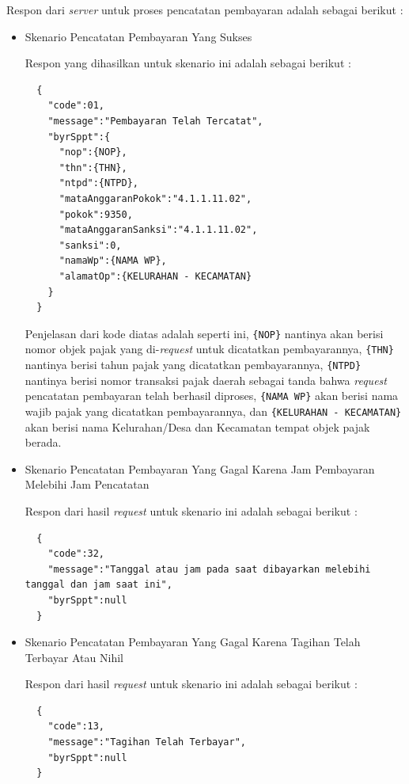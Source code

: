 \documentclass[pdftex,12pt, oneside]{article}
\begin{document}
Respon dari \textit{server} untuk proses pencatatan pembayaran adalah sebagai berikut :

\begin{itemize}
  \item Skenario Pencatatan Pembayaran Yang Sukses
  
  Respon yang dihasilkan untuk skenario ini adalah sebagai berikut :
  
  \begin{lstlisting}
  {
    "code":01,
    "message":"Pembayaran Telah Tercatat",
    "byrSppt":{
      "nop":{NOP},
      "thn":{THN},
      "ntpd":{NTPD},
      "mataAnggaranPokok":"4.1.1.11.02",
      "pokok":9350,
      "mataAnggaranSanksi":"4.1.1.11.02",
      "sanksi":0,
      "namaWp":{NAMA WP},
      "alamatOp":{KELURAHAN - KECAMATAN}
    }
  }
  \end{lstlisting}
  
  Penjelasan dari kode diatas adalah seperti ini, \texttt{\{NOP\}} nantinya akan berisi nomor objek pajak yang di-\textit{request} untuk dicatatkan pembayarannya, \texttt{\{THN\}} nantinya berisi tahun pajak yang dicatatkan pembayarannya, \texttt{\{NTPD\}} nantinya berisi nomor transaksi pajak daerah sebagai tanda bahwa \textit{request} pencatatan pembayaran telah berhasil diproses, \texttt{\{NAMA WP\}} akan berisi nama wajib pajak yang dicatatkan pembayarannya, dan \texttt{\{KELURAHAN - KECAMATAN\}} akan berisi nama Kelurahan/Desa dan Kecamatan tempat objek pajak berada.
  
  \item Skenario Pencatatan Pembayaran Yang Gagal Karena Jam Pembayaran Melebihi Jam Pencatatan
  
  Respon dari hasil \textit{request} untuk skenario ini adalah sebagai berikut :
  
  \begin{lstlisting}
  {
    "code":32,
    "message":"Tanggal atau jam pada saat dibayarkan melebihi tanggal dan jam saat ini",
    "byrSppt":null
  }
  \end{lstlisting}
  
  \item Skenario Pencatatan Pembayaran Yang Gagal Karena Tagihan Telah Terbayar Atau Nihil
  
  Respon dari hasil \textit{request} untuk skenario ini adalah sebagai berikut :
  
  \begin{lstlisting}
  {
    "code":13,
    "message":"Tagihan Telah Terbayar",
    "byrSppt":null
  }
  \end{lstlisting}
  

\end{itemize}
\end{document}
